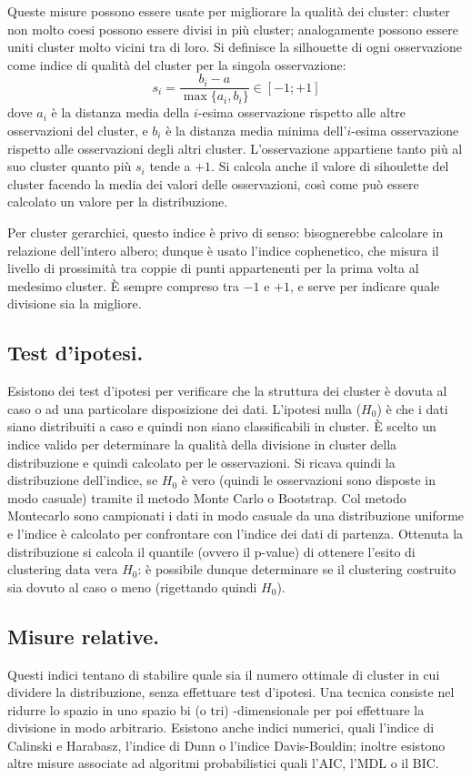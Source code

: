 \documentclass[11pt, a4page, twocolumn]{article}
\begin{document}
Queste misure possono essere usate per migliorare la qualità dei cluster: cluster non molto coesi possono essere divisi in più cluster; analogamente possono essere uniti cluster molto vicini tra di loro.
Si definisce la silhouette di ogni osservazione come indice di qualità del cluster per la singola osservazione:
\begin{equation*}
  s_i = \frac{b_i - a}{\max{\{a_i, b_i\}}} \in [-1; +1]
\end{equation*}
dove $a_i$ è la distanza media della $i$-esima osservazione rispetto alle altre osservazioni del cluster, e $b_i$ è la distanza media minima dell'$i$-esima osservazione rispetto alle osservazioni degli altri cluster.
L'osservazione appartiene tanto più al suo cluster quanto più $s_i$ tende a $+1$.
Si calcola anche il valore di sihoulette del cluster facendo la media dei valori delle osservazioni, così come può essere calcolato un valore per la distribuzione.

Per cluster gerarchici, questo indice è privo di senso: bisognerebbe calcolare in relazione dell'intero albero; dunque è usato l'indice cophenetico, che misura il livello di prossimità tra coppie di punti appartenenti per la prima volta al medesimo cluster.
È sempre compreso tra $-1$ e $+1$, e serve per indicare quale divisione sia la migliore. \newline

\subsection{Test d'ipotesi.}
Esistono dei test d'ipotesi per verificare che la struttura dei cluster è dovuta al caso o ad una particolare disposizione dei dati.
L'ipotesi nulla ($H_0$) è che i dati siano distribuiti a caso e quindi non siano classificabili in cluster.
È scelto un indice valido per determinare la qualità della divisione in cluster della distribuzione e quindi calcolato per le osservazioni.
Si ricava quindi la distribuzione dell'indice, se $H_0$ è vero (quindi le osservazioni sono disposte in modo casuale) tramite il metodo Monte Carlo o Bootstrap.
Col metodo Montecarlo sono campionati i dati in modo casuale da una distribuzione uniforme e l'indice è calcolato per confrontare con l'indice dei dati di partenza.
Ottenuta la distribuzione si calcola il quantile (ovvero il p-value) di ottenere l'esito di clustering data vera $H_0$: è possibile dunque determinare se il clustering costruito sia dovuto al caso o meno (rigettando quindi $H_0$).

\subsection{Misure relative.}
Questi indici tentano di stabilire quale sia il numero ottimale di cluster in cui dividere la distribuzione, senza effettuare test d'ipotesi.
Una tecnica consiste nel ridurre lo spazio in uno spazio bi (o tri) -dimensionale per poi effettuare la divisione in modo arbitrario.
Esistono anche indici numerici, quali l'indice di Calinski e Harabasz, l'indice di Dunn o l'indice Davis-Bouldin; inoltre esistono altre misure associate ad algoritmi probabilistici quali l'AIC, l'MDL o il BIC.
\end{document}

